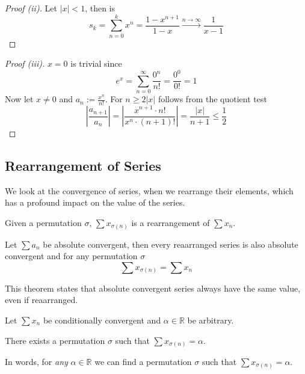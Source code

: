 \begin{proof}[Proof (ii)]
   Let \(|x| < 1 \), then is
   \[s_k = \sum_{n = 0}^k x^n = \frac{1 - x^{n+1}}{1 - x} \xrightarrow{n \to \infty} \frac{1}{x-1}\]
\end{proof}
\begin{proof}[Proof (iii)]
   \(x = 0\) is trivial since
   \[e^x = \sum_{n=0}^\infty \frac{0^n}{n!} = \frac{0^0}{0!} = 1\]
   Now let \(x \neq 0\) and \(a_n := \frac{x^n}{n!}\).
   For \(n \geq 2\lvert x\rvert\) follows from the quotient test
   \[\left\lvert \frac{a_{n+1}}{a_n} \right\rvert = \left\lvert \frac{x^{n+1} \cdot n!}{x^n \cdot (n+1)!}\right\rvert = \frac{\lvert x\rvert}{n+1} \leq \frac{1}{2}\]
\end{proof}

\subsection{Rearrangement of Series}
We look at the convergence of series, when we rearrange their elements, which has a profound impact on the value of the series.
\begin{definition}
   Given a permutation \(\sigma\), \(\sum x_{\sigma(n)}\) is a rearrangement of \(\sum x_n\).
\end{definition}

\begin{theorem}\label{thm:rearrange_series}
   Let \(\sum a_n\) be absolute convergent, then every reaarranged series is also absolute convergent and for any permutation \(\sigma\)
   \[\sum x_{\sigma(n)} = \sum x_n\]
\end{theorem}
\begin{remark}
   This theorem states that absolute convergent series always have the same value, even if reaarranged.
\end{remark}

\begin{proposition}\label{pro:riemann_rearrang}
   Let \(\sum x_n\) be conditionally convergent and \(\alpha \in \mathbb{R}\) be arbitrary.

   There exists a permutation \(\sigma\) such that \(\sum x_{\sigma(n)} = \alpha\).
\end{proposition}
\begin{remark}[Intuition]
   In words, for \emph{any} \(\alpha \in \mathbb{R}\) we can find a permutation \(\sigma\) such that \(\sum x_{\sigma(n)} = \alpha\).
\end{remark}

